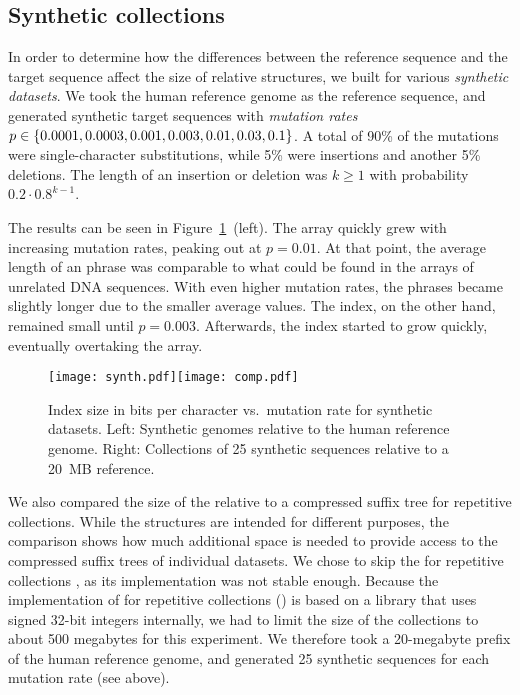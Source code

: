 \subsection{Synthetic collections}

In order to determine how the differences between the reference sequence and
the target sequence affect the size of relative structures, we built \RCST{}
for various \emph{synthetic datasets}. We took the human reference genome as
the reference sequence, and generated synthetic target sequences with
\emph{mutation rates} $p \in \{ 0.0001, 0.0003, 0.001, 0.003, 0.01, 0.03,
0.1 \}$. A total of 90\% of the mutations were single-character substitutions,
while 5\% were insertions and another 5\% deletions. The length of an
insertion or deletion was $k \ge 1$ with probability $0.2 \cdot 0.8^{k-1}$.

The results can be seen in Figure~\ref{fig:synthetic}~(left). The \RLCP{}
array quickly grew with increasing mutation rates, peaking out at $p = 0.01$.
At that point, the average length of an \RLZ{} phrase was comparable to what
could be found in the \DLCP{} arrays of unrelated DNA sequences. With even
higher mutation rates, the phrases became slightly longer due to the smaller
average \LCP{} values. The \RFM{} index, on the other hand, remained small
until $p = 0.003$. Afterwards, the index started to grow quickly, eventually
overtaking the \RLCP{} array.

\begin{figure}
\begin{center}
\texttt{[image: synth.pdf]}\hspace{-0.4in}\texttt{[image: comp.pdf]}
\end{center}
\caption{Index size in bits per character vs.~mutation rate for synthetic
datasets. Left: Synthetic genomes relative to the human reference genome.
Right: Collections of 25 synthetic sequences relative to a 20~MB
reference.}\label{fig:synthetic}
\end{figure}

We also compared the size of the relative \CST{} to a compressed suffix tree
for repetitive collections. While the structures are intended for different
purposes, the comparison shows how much additional space is needed to provide
access to the compressed suffix trees of individual datasets. We chose to skip
the \CSTnpr{} for repetitive collections \cite{Abeliuk2013}, as its
implementation was not stable enough. Because the implementation of \CSTsada{}
for repetitive collections (\GCT) \cite{Navarro2014} is based on a library
that uses signed 32\nobreakdash-bit integers internally, we had to limit the
size of the collections to about 500 megabytes for this experiment. We
therefore took a 20\nobreakdash-megabyte prefix of the human reference genome,
and generated 25 synthetic sequences for each mutation rate (see above).

